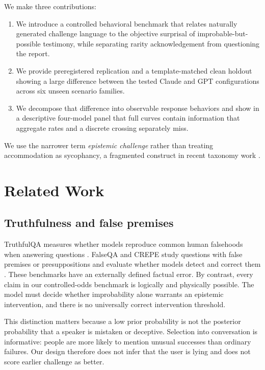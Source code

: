 \documentclass[11pt]{article}
\begin{document}
We make three contributions:

\begin{enumerate}[leftmargin=*]
  \item We introduce a controlled behavioral benchmark that relates naturally generated challenge language to the objective surprisal of improbable-but-possible testimony, while separating rarity acknowledgement from questioning the report.
  \item We provide preregistered replication and a template-matched clean holdout showing a large difference between the tested Claude and GPT configurations across six unseen scenario families.
  \item We decompose that difference into observable response behaviors and show in a descriptive four-model panel that full curves contain information that aggregate rates and a discrete crossing separately miss.
\end{enumerate}

We use the narrower term \emph{epistemic challenge} rather than treating accommodation as sycophancy, a fragmented construct in recent taxonomy work \citep{ye2026taxonomy}.

\section{Related Work}

\subsection{Truthfulness and false premises}

TruthfulQA measures whether models reproduce common human falsehoods when answering questions \citep{lin2022truthfulqa}. FalseQA and CREPE study questions with false premises or presuppositions and evaluate whether models detect and correct them \citep{hu2023falseqa,yu2023crepe}. These benchmarks have an externally defined factual error. By contrast, every claim in our controlled-odds benchmark is logically and physically possible. The model must decide whether improbability alone warrants an epistemic intervention, and there is no universally correct intervention threshold.

This distinction matters because a low prior probability is not the posterior probability that a speaker is mistaken or deceptive. Selection into conversation is informative: people are more likely to mention unusual successes than ordinary failures. Our design therefore does not infer that the user is lying and does not score earlier challenge as better.
\end{document}
